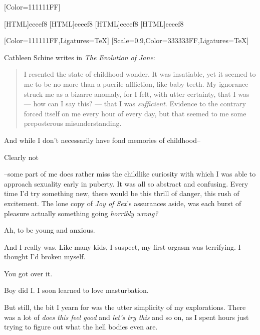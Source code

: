 \label{sex:sex}
\renewfontfamily{}[Color=111111FF]

[HTML]{eeeef8}
[HTML]{eeeef8}
[HTML]{eeeef8}
[HTML]{eeeef8}

\begin{paracol}{2}
\begin{leftcolumn}

[Color=111111FF,Ligatures=TeX]
\renewfontfamily{}[Scale=0.9,Color=333333FF,Ligatures=TeX]

\noindent Cathleen Schine writes in \emph{The Evolution of Jane}:

\begin{quotation}
  \noindent I resented the state of childhood wonder.  It was insatiable, yet it seemed to me to be no more than a puerile affliction, like baby teeth.  My ignorance struck me as a bizarre anomaly, for I felt, with utter certainty, that I was --- how can I say this? --- that I was \emph{sufficient}.  Evidence to the contrary forced itself on me every hour of every day, but that seemed to me some preposterous misunderstanding.
\end{quotation}
And while I don't necessarily have fond memories of childhood--

\begin{ally}
Clearly not
\end{ally}
--some part of me does rather miss the childlike curiosity with which I was able to approach sexuality early in puberty. It was all so abstract and confusing. Every time I'd try something new, there would be this thrill of danger, this rush of excitement. The lone copy of \emph{Joy of Sex}'s assurances aside, was each burst of pleasure actually something going \emph{horribly wrong?}

\begin{ally}
Ah, to be young and anxious.
\end{ally}
And I really was. Like many kids, I suspect, my first orgasm was terrifying. I thought I'd broken myself.

\begin{ally}
You got over it.
\end{ally}
Boy did I. I soon learned to love masturbation.

But still, the bit I yearn for was the utter simplicity of my explorations. There was a lot of \emph{does this feel good} and \emph{let's try this} and so on, as I spent hours just trying to figure out what the hell bodies even are.


\end{leftcolumn}
\end{paracol}
